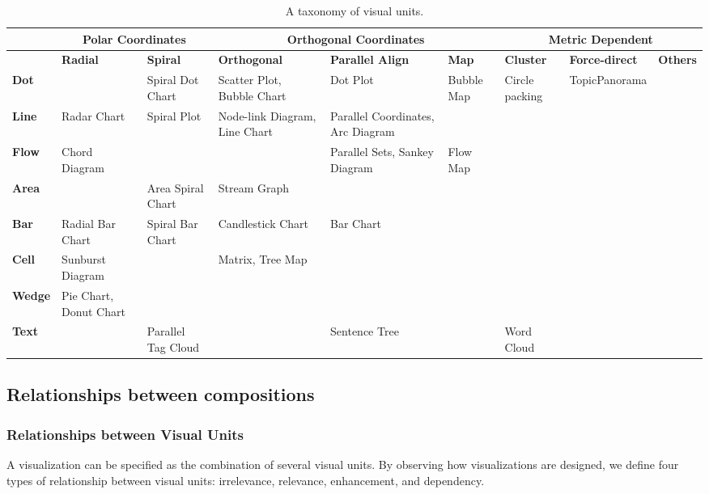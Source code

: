 \begin{table*}[tb]
  \caption{A taxonomy of visual units.}
  \label{tab:unit}
  \small
  \centering
  \begin{tabular}{|p{1.2cm}|p{1.2cm}|p{1.2cm}|p{1.2cm}|p{1.2cm}|p{1.2cm}|p{1.2cm}|p{1.2cm}|p{1.2cm}|}
  \toprule
   \textbf{} &\multicolumn{2}{|c|}{Polar Coordinates} &\multicolumn{3}{|c|}{Orthogonal Coordinates}&\multicolumn{3}{|c|}{Metric Dependent}   \\ 
  \midrule
  
 \textbf{} &\textbf{Radial} &\textbf{Spiral} &\textbf{Orthogonal} & \textbf{Parallel Align}&\textbf{Map}&\textbf{Cluster}&\textbf{Force-direct}&\textbf{Others}   \\ 
  \midrule
  \textbf{Dot} &    &Spiral Dot Chart&Scatter Plot, Bubble Chart & Dot Plot & Bubble Map &  Circle packing    &TopicPanorama\cite{7042494}  &    \\
  \midrule
  \textbf{Line}&  Radar Chart   &  Spiral Plot    &Node-link Diagram, Line Chart & Parallel Coordinates, Arc Diagram &    &   &     & \\ 
  \midrule
   \textbf{Flow}&  Chord Diagram   &    & &Parallel Sets, Sankey Diagram & 
   Flow Map  &   &   &\\
  \midrule
  \textbf{Area}&    &Area Spiral Chart &Stream Graph &  & & &   &\\ 
  \midrule
  \textbf{Bar}&      Radial Bar Chart & Spiral Bar Chart  & Candlestick Chart & Bar Chart  &    &    &    &\\
  \midrule
  \textbf{Cell}& Sunburst Diagram  &    & Matrix, Tree Map &     & & &   &\\
  \midrule
  \textbf{Wedge}& Pie Chart, Donut Chart &  &   &   &  &    &   &\\
  \midrule
  \textbf{Text}&    &Parallel Tag Cloud \cite{collins2009parallel} &    &  Sentence Tree  &     &Word Cloud  &   &    \\
  \bottomrule
  
  \end{tabular}
  \vspace{1mm}
\end{table*}


\subsection{Relationships between compositions}
\subsubsection{Relationships between Visual Units}
A visualization can be specified as the combination of several visual units. 
By observing how visualizations are designed,
we define four types of relationship between visual units: irrelevance, relevance, enhancement, and dependency. 

